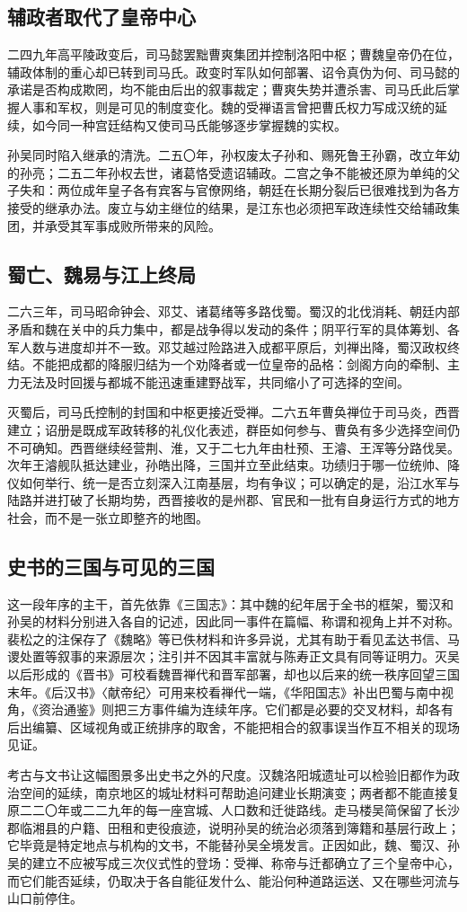 \subsection{辅政者取代了皇帝中心}

二四九年高平陵政变后，司马懿罢黜曹爽集团并控制洛阳中枢；曹魏皇帝仍在位，辅政体制的重心却已转到司马氏。政变时军队如何部署、诏令真伪为何、司马懿的承诺是否构成欺罔，均不能由后出的叙事裁定；曹爽失势并遭杀害、司马氏此后掌握人事和军权，则是可见的制度变化。魏的受禅语言曾把曹氏权力写成汉统的延续，如今同一种宫廷结构又使司马氏能够逐步掌握魏的实权。

孙吴同时陷入继承的清洗。二五〇年，孙权废太子孙和、赐死鲁王孙霸，改立年幼的孙亮；二五二年孙权去世，诸葛恪受遗诏辅政。二宫之争不能被还原为单纯的父子失和：两位成年皇子各有宾客与官僚网络，朝廷在长期分裂后已很难找到为各方接受的继承办法。废立与幼主继位的结果，是江东也必须把军政连续性交给辅政集团，并承受其军事成败所带来的风险。

\subsection{蜀亡、魏易与江上终局}

二六三年，司马昭命钟会、邓艾、诸葛绪等多路伐蜀。蜀汉的北伐消耗、朝廷内部矛盾和魏在关中的兵力集中，都是战争得以发动的条件；阴平行军的具体筹划、各军人数与进度却并不一致。邓艾越过险路进入成都平原后，刘禅出降，蜀汉政权终结。不能把成都的降服归结为一个劝降者或一位皇帝的品格：剑阁方向的牵制、主力无法及时回援与都城不能迅速重建野战军，共同缩小了可选择的空间。

灭蜀后，司马氏控制的封国和中枢更接近受禅。二六五年曹奂禅位于司马炎，西晋建立；诏册是既成军政转移的礼仪化表述，群臣如何参与、曹奂有多少选择空间仍不可确知。西晋继续经营荆、淮，又于二七九年由杜预、王濬、王浑等分路伐吴。次年王濬舰队抵达建业，孙皓出降，三国并立至此结束。功绩归于哪一位统帅、降仪如何举行、统一是否立刻深入江南基层，均有争议；可以确定的是，沿江水军与陆路并进打破了长期均势，西晋接收的是州郡、官民和一批有自身运行方式的地方社会，而不是一张立即整齐的地图。

\subsection{史书的三国与可见的三国}

这一段年序的主干，首先依靠《三国志》：其中魏的纪年居于全书的框架，蜀汉和孙吴的材料分别进入各自的记述，因此同一事件在篇幅、称谓和视角上并不对称。裴松之的注保存了《魏略》等已佚材料和许多异说，尤其有助于看见孟达书信、马谡处置等叙事的来源层次；注引并不因其丰富就与陈寿正文具有同等证明力。灭吴以后形成的《晋书》可校看魏晋禅代和晋军部署，却也以后来的统一秩序回望三国末年。《后汉书》〈献帝纪〉可用来校看禅代一端，《华阳国志》补出巴蜀与南中视角，《资治通鉴》则把三方事件编为连续年序。它们都是必要的交叉材料，却各有后出编纂、区域视角或正统排序的取舍，不能把相合的叙事误当作互不相关的现场见证。

考古与文书让这幅图景多出史书之外的尺度。汉魏洛阳城遗址可以检验旧都作为政治空间的延续，南京地区的城址材料可帮助追问建业长期演变；两者都不能直接复原二二〇年或二二九年的每一座宫城、人口数和迁徙路线。走马楼吴简保留了长沙郡临湘县的户籍、田租和吏役痕迹，说明孙吴的统治必须落到簿籍和基层行政上；它毕竟是特定地点与机构的文书，不能替孙吴全境发言。正因如此，魏、蜀汉、孙吴的建立不应被写成三次仪式性的登场：受禅、称帝与迁都确立了三个皇帝中心，而它们能否延续，仍取决于各自能征发什么、能沿何种道路运送、又在哪些河流与山口前停住。
